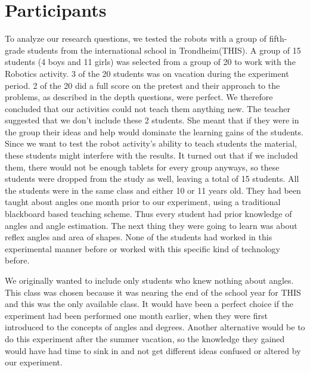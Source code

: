 \chapter{Participants}
To analyze our research questions, we tested the robots with a group of fifth-grade students from the international school in Trondheim(THIS). A group of 15 students (4 boys and 11 girls) was selected from a group of 20 to work with the Robotics activity. 3 of the 20 students was on vacation during the experiment period. 2 of the 20 did a full score on the pretest and their approach to the problems, as described in the depth questions, were perfect. We therefore concluded that our activities could not teach them anything new. The teacher suggested that we don't include these 2 students. She meant that if they were in the group their ideas and help would dominate the learning gains of the students. Since we want to test the robot activity's ability to teach students the material, these students might interfere with the results. It turned out that if we included them, there would not be enough tablets for every group anyways, so these students were dropped from the study as well, leaving a total of 15 students. All the students were in the same class and either 10 or 11 years old. They had been taught about angles one month prior to our experiment, using a traditional blackboard based teaching scheme. Thus every student had prior knowledge of angles and angle estimation. The next thing they were going to learn was about reflex angles and area of shapes. None of the students had worked in this experimental manner before or worked with this specific kind of technology before.

\bigskip\noindent
We originally wanted to include only students who knew nothing about angles. This class was chosen because it was nearing the end of the school year for THIS and this was the only available class. It would have been a perfect choice if the experiment had been performed one month earlier, when they were first introduced to the concepts of angles and degrees. Another alternative would be to do this experiment after the summer vacation, so the knowledge they gained would have had time to sink in and not get different ideas confused or altered by our experiment. 